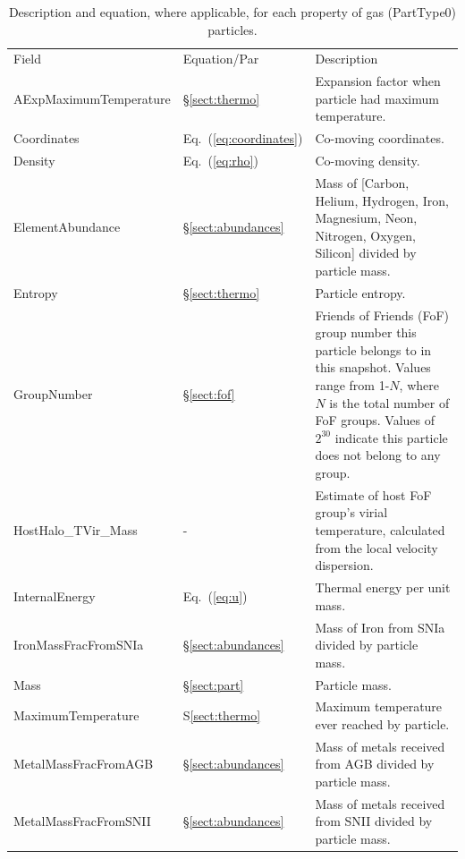\documentclass[10pt, a4paper]{article}
\newcommand{\groupnumber}{Friends of Friends (FoF) group number this particle
belongs to in this snapshot. Values range from 1-$N$, where $N$ is the total
number of FoF groups. Values of $2^{30}$ indicate this particle does not belong
to any group.}
\newcommand{\coordinates}{Co-moving coordinates.}
\begin{document}
\begin{table}
\label{table:gas}
\caption{Description and equation, where applicable, for each property of gas
(PartType0) particles.}
\begin{center}
\footnotesize
\renewcommand{\arraystretch}{1.5}
\begin{tabular}{>{\ttfamily}p{4cm}p{1.5cm}p{11cm}}
\multicolumn{3}{l}{\large \bf PartType0: Gas} \\
\hline
Field & Equation/Par & Description \\ \hline\hline

AExpMaximumTemperature &
\S\ref{sect:thermo} &
Expansion factor when particle had maximum temperature. \\

Coordinates &
Eq.~(\ref{eq:coordinates}) &
\coordinates \\

Density &
Eq.~(\ref{eq:rho}) &
Co-moving density. \\

ElementAbundance &
\S\ref{sect:abundances} &
Mass of [Carbon, Helium, Hydrogen, Iron, Magnesium, Neon, Nitrogen, Oxygen, Silicon] divided by particle mass. \\

Entropy &
\S\ref{sect:thermo} &
Particle entropy. \\

GroupNumber & \S\ref{sect:fof} & \groupnumber \\

HostHalo\_TVir\_Mass &
- &
Estimate of host FoF group's virial temperature, calculated from the local velocity dispersion. \\

InternalEnergy &
Eq.~(\ref{eq:u}) &
Thermal energy per unit mass. \\

IronMassFracFromSNIa &
\S\ref{sect:abundances} &
Mass of Iron from SNIa divided by particle mass. \\

Mass &
\S\ref{sect:part} &
Particle mass.\\

MaximumTemperature &
S\ref{sect:thermo} &
Maximum temperature ever reached by particle. \\

MetalMassFracFromAGB &
\S\ref{sect:abundances} &
Mass of metals received from AGB divided by particle mass. \\

MetalMassFracFromSNII &
\S\ref{sect:abundances} &
Mass of metals received from SNII divided by particle mass. \\


\end{tabular}
\end{center}
\end{table}
\end{document}
